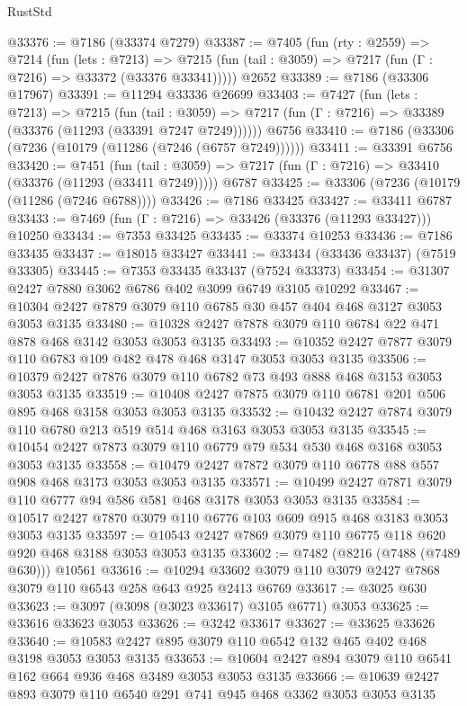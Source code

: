 \begin{lexlean}{RustStd}
\begin{coremodule}
{\begin{coremodule}
{{{{{{{{{{{{{{{{{{{{{{{{{{{{{{{{@33376 := @7186 (@33374 @7279)
@33387 := @7405
    (fun (rty : @2559) =>
    @7214
      (fun (lets : @7213) =>
      @7215 (fun (tail : @3059) => @7217 (fun (Γ : @7216) => @33372 (@33376 @33341)))))
    @2652
@33389 := @7186 (@33306 @17967)
@33391 := @11294 @33336 @26699
@33403 := @7427
    (fun (lets : @7213) =>
    @7215
      (fun (tail : @3059) =>
      @7217 (fun (Γ : @7216) => @33389 (@33376 (@11293 (@33391 @7247 @7249))))))
    @6756
@33410 := @7186 (@33306 (@7236 (@10179 (@11286 (@7246 (@6757 @7249))))))
@33411 := @33391 @6756
@33420 := @7451
    (fun (tail : @3059) => @7217 (fun (Γ : @7216) => @33410 (@33376 (@11293 (@33411 @7249)))))
    @6787
@33425 := @33306 (@7236 (@10179 (@11286 (@7246 @6788))))
@33426 := @7186 @33425
@33427 := @33411 @6787
@33433 := @7469 (fun (Γ : @7216) => @33426 (@33376 (@11293 @33427))) @10250
@33434 := @7353 @33425
@33435 := @33374 @10253
@33436 := @7186 @33435
@33437 := @18015 @33427
@33441 := @33434 (@33436 @33437) (@7519 @33305)
@33445 := @7353 @33435 @33437 (@7524 @33373)
@33454 := @31307 @2427 @7880 @3062 @6786 @402 @3099 @6749 @3105 @10292
@33467 := @10304 @2427 @7879 @3079 @110 @6785 @30 @457 @404 @468 @3127 @3053 @3053 @3135
@33480 := @10328 @2427 @7878 @3079 @110 @6784 @22 @471 @878 @468 @3142 @3053 @3053 @3135
@33493 := @10352 @2427 @7877 @3079 @110 @6783 @109 @482 @478 @468 @3147 @3053 @3053 @3135
@33506 := @10379 @2427 @7876 @3079 @110 @6782 @73 @493 @888 @468 @3153 @3053 @3053 @3135
@33519 := @10408 @2427 @7875 @3079 @110 @6781 @201 @506 @895 @468 @3158 @3053 @3053 @3135
@33532 := @10432 @2427 @7874 @3079 @110 @6780 @213 @519 @514 @468 @3163 @3053 @3053 @3135
@33545 := @10454 @2427 @7873 @3079 @110 @6779 @79 @534 @530 @468 @3168 @3053 @3053 @3135
@33558 := @10479 @2427 @7872 @3079 @110 @6778 @88 @557 @908 @468 @3173 @3053 @3053 @3135
@33571 := @10499 @2427 @7871 @3079 @110 @6777 @94 @586 @581 @468 @3178 @3053 @3053 @3135
@33584 := @10517 @2427 @7870 @3079 @110 @6776 @103 @609 @915 @468 @3183 @3053 @3053 @3135
@33597 := @10543 @2427 @7869 @3079 @110 @6775 @118 @620 @920 @468 @3188 @3053 @3053 @3135
@33602 := @7482 (@8216 (@7488 (@7489 @630))) @10561
@33616 := @10294 @33602 @3079 @110 @3079 @2427 @7868 @3079 @110 @6543 @258 @643 @925 @2413 @6769
@33617 := @3025 @630
@33623 := @3097 (@3098 (@3023 @33617) @3105 @6771) @3053
@33625 := @33616 @33623 @3053
@33626 := @3242 @33617
@33627 := @33625 @33626
@33640 := @10583 @2427 @895 @3079 @110 @6542 @132 @465 @402 @468 @3198 @3053 @3053 @3135
@33653 := @10604 @2427 @894 @3079 @110 @6541 @162 @664 @936 @468 @3489 @3053 @3053 @3135
@33666 := @10639 @2427 @893 @3079 @110 @6540 @291 @741 @945 @468 @3362 @3053 @3053 @3135
}}}}}}}}}}}}}}}}}}}}}}}}}}}}}}}}
\end{coremodule}}
\end{coremodule}
\end{lexlean}
